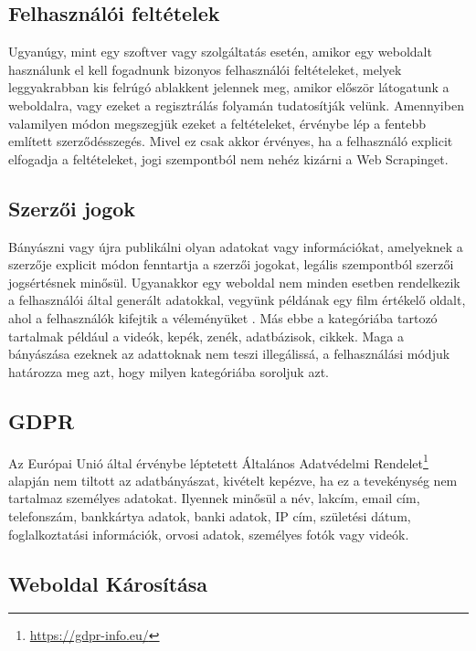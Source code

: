 \subsection{Felhasználói feltételek}

Ugyanúgy, mint egy szoftver vagy szolgáltatás esetén, amikor egy weboldalt használunk el kell fogadnunk bizonyos felhasználói feltételeket, melyek leggyakrabban kis felrúgó ablakkent jelennek meg, amikor először látogatunk a weboldalra, vagy ezeket a regisztrálás folyamán tudatosítják velünk. Amennyiben valamilyen módon megszegjük ezeket a feltételeket, érvénybe lép a fentebb említett szerződésszegés. Mivel ez csak akkor érvényes, ha a felhasználó explicit elfogadja a feltételeket, jogi szempontból nem nehéz kizárni a Web Scrapinget. 

\subsection{Szerzői jogok}

Bányászni vagy újra publikálni olyan adatokat vagy információkat, amelyeknek a szerzője explicit módon fenntartja a szerzői jogokat, legális szempontból szerzői jogsértésnek minősül. Ugyanakkor egy weboldal nem minden esetben rendelkezik a felhasználói által generált adatokkal, vegyünk példának egy film értékelő oldalt, ahol a felhasználók kifejtik a véleményüket \cite{krotov2018legality}. Más ebbe a kategóriába tartozó tartalmak például a videók, kepék, zenék, adatbázisok, cikkek. Maga a bányászása ezeknek az adattoknak nem teszi illegálissá, a felhasználási módjuk határozza meg azt, hogy milyen kategóriába soroljuk azt. 

\subsection{GDPR}

Az Európai Unió által érvénybe léptetett Általános Adatvédelmi Rendelet\footnote{\url{https://gdpr-info.eu/}} alapján nem tiltott az adatbányászat, kivételt kepézve, ha ez a tevekénység nem tartalmaz személyes adatokat. Ilyennek minősül a név, lakcím, email cím, telefonszám, bankkártya adatok, banki adatok, IP cím, születési dátum, foglalkoztatási információk, orvosi adatok, személyes fotók vagy videók.

\subsection{Weboldal Károsítása}

